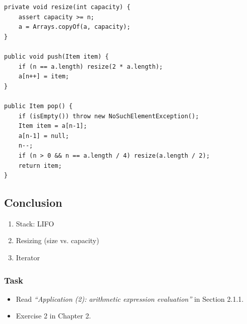 \documentclass[aspectratio=169, 14pt]{beamer}
\begin{document}
\begin{frame}[fragile]
    \begin{verbatim}
private void resize(int capacity) {
    assert capacity >= n;
    a = Arrays.copyOf(a, capacity);
}

public void push(Item item) {
    if (n == a.length) resize(2 * a.length);
    a[n++] = item;
}

public Item pop() {
    if (isEmpty()) throw new NoSuchElementException();
    Item item = a[n-1];
    a[n-1] = null;
    n--;
    if (n > 0 && n == a.length / 4) resize(a.length / 2);
    return item;
}
    \end{verbatim}
\end{frame}

\begin{frame}
\section{\textcolor{darkmidnightblue}{Conclusion}}
    \begin{enumerate}
        \item Stack: LIFO
        \item Resizing (size vs. capacity)
        \item Iterator
    \end{enumerate}
\end{frame}

\begin{frame}
    \frametitle{Task}
    \begin{itemize}
        \item  Read \emph{``Application (2): arithmetic expression evaluation''} in Section 2.1.1.
        \item Exercise 2 in Chapter 2.
    \end{itemize}

\end{frame}
\end{document}
